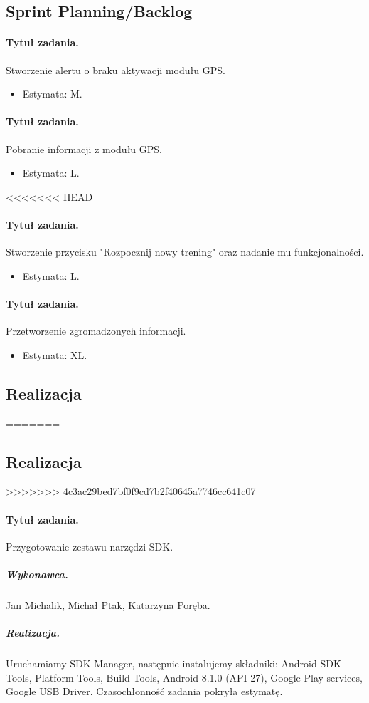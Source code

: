 \documentclass[a4paper]{article}
\begin{document}
\subsection{Sprint Planning/Backlog}

\paragraph{Tytuł zadania.} Stworzenie alertu o braku aktywacji modułu GPS.
\begin{itemize}
\item Estymata: M.
\end{itemize}

\paragraph{Tytuł zadania.} Pobranie informacji z modułu GPS.
\begin{itemize}
\item Estymata: L.
\end{itemize}

<<<<<<< HEAD
\paragraph{Tytuł zadania.} Stworzenie przycisku "Rozpocznij nowy trening" oraz nadanie mu funkcjonalności.
\begin{itemize}
\item Estymata: L.
\end{itemize}

\paragraph{Tytuł zadania.} Przetworzenie zgromadzonych informacji.
\begin{itemize}
\item Estymata: XL.
\end{itemize}

\subsection{Realizacja}
=======
\subsection{Realizacja} 
>>>>>>> 4c3ac29bed7bf0f9cd7b2f40645a7746cc641c07

\paragraph{Tytuł zadania.} Przygotowanie zestawu narzędzi SDK.
\subparagraph{Wykonawca.} Jan Michalik, Michał Ptak, Katarzyna Poręba.
\subparagraph{Realizacja.} Uruchamiamy SDK Manager, następnie instalujemy składniki: Android SDK Tools, Platform Tools, Build Tools, Android 8.1.0 (API 27), Google Play services, Google USB Driver. Czasochłonność zadania pokryła estymatę.
\end{document}
